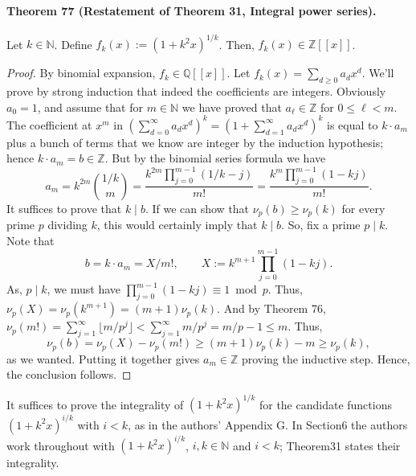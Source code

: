 \paragraph{Theorem 77 (Restatement of Theorem 31, Integral power series).} Let $k\in\mathbb N$. Define $f_k(x):=(1+k^2x)^{1/k}$. Then, $f_k(x)\in\mathbb Z[[x]]$.
\begin{proof}By binomial expansion, $f_k\in\mathbb Q[[x]]$. Let $f_k(x)=\sum_{d\ge0}a_dx^d$. We'll prove by strong induction that indeed the coefficients are integers. Obviously $a_0=1$, and assume that for $m\in\mathbb N$ we have proved that $a_\ell\in\mathbb Z$ for $0\le\ell<m$. The coefficient at $x^m$ in $(\sum_{d=0}^\infty a_dx^d)^k=(1+\sum_{d=1}^\infty a_dx^d)^k$ is equal to $k\cdot a_m$ plus a bunch of terms that we know are integer by the induction hypothesis; hence $k\cdot a_m=b\in\mathbb Z$. But by the binomial series formula we have
\[a_m=k^{2m}\binom{1/k}m=\frac{k^{2m}\prod_{j=0}^{m-1}(1/k-j)}{m!}=\frac{k^m\prod_{j=0}^{m-1}(1-kj)}{m!}.\]
It suffices to prove that $k\mid b$. If we can show that $\nu_p(b)\ge\nu_p(k)$ for every prime $p$ dividing $k$, this would certainly imply that $k\mid b$. So, fix a prime $p\mid k$. Note that
\[b=k\cdot a_m=X/m!,\qquad X:=k^{m+1}\prod_{j=0}^{m-1}(1-kj).\]
As, $p\mid k$, we must have $\prod_{j=0}^{m-1}(1-kj)\equiv1\bmod p$. Thus, $\nu_p(X)=\nu_p(k^{m+1})=(m+1)\nu_p(k)$. And by Theorem 76, $\nu_p(m!)=\sum_{j=1}^\infty\lfloor m/p^j\rfloor<\sum_{j=1}^\infty m/p^j=m/p-1\le m$. Thus,
\[\nu_p(b)=\nu_p(X)-\nu_p(m!)\ge(m+1)\nu_p(k)-m\ge\nu_p(k),\]
as we wanted. Putting it together gives $a_m\in\mathbb Z$ proving the inductive step. Hence, the conclusion follows.\end{proof}
It suffices to prove the integrality of $(1+k^2x)^{1/k}$ for the candidate functions $(1+k^2x)^{i/k}$ with $i<k$, as in the authors' Appendix G. In Section6 the authors work throughout with $(1+k^2x)^{i/k}$, $i,k\in\mathbb N$ and $i<k$; Theorem31 states their integrality.
